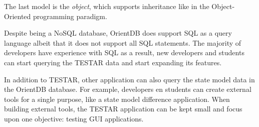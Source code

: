     The last model is the \hypertarget{db:object}{\emph{object}}, which supports inheritance like in the Object-Oriented programming paradigm.

    Despite being a NoSQL database, OrientDB does support SQL as a query language \cite{sql-lang} albeit that it does not support all SQL statements. The majority of developers have experience with SQL \cite{sql-stats} as a result, new developers and students can start querying the TESTAR data and start expanding its features.
    
    In addition to TESTAR, other application can also query the state model data in the OrientDB database. For example, developers en students can create external tools for a single purpose, like a state model difference application. When building external tools, the TESTAR application can be kept small and focus upon one objective: testing GUI applications. 